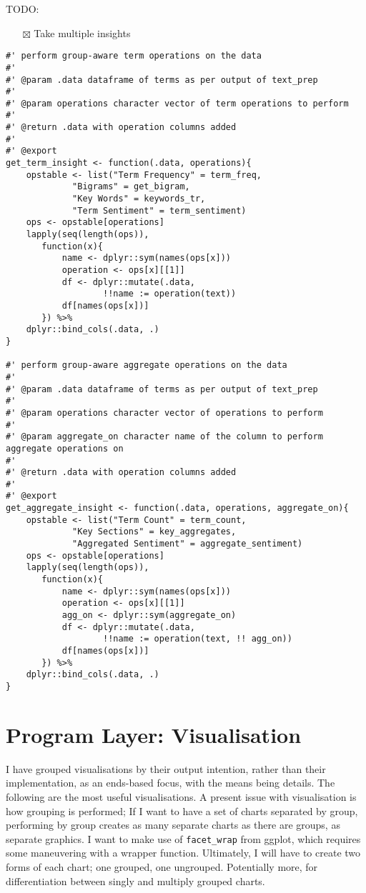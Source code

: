 \documentclass[a4paper, 11pt]{article}
\begin{document}
TODO:
\begin{itemize}
\item[{$\boxtimes$}] Take multiple insights
\end{itemize}
\begin{verbatim}
#' perform group-aware term operations on the data
#'
#' @param .data dataframe of terms as per output of text_prep
#'
#' @param operations character vector of term operations to perform
#'
#' @return .data with operation columns added
#'
#' @export
get_term_insight <- function(.data, operations){
    opstable <- list("Term Frequency" = term_freq,
		     "Bigrams" = get_bigram,
		     "Key Words" = keywords_tr,
		     "Term Sentiment" = term_sentiment)
    ops <- opstable[operations]
    lapply(seq(length(ops)),
	   function(x){
	       name <- dplyr::sym(names(ops[x]))
	       operation <- ops[x][[1]]
	       df <- dplyr::mutate(.data,
				   !!name := operation(text))
	       df[names(ops[x])]
	   }) %>%
	dplyr::bind_cols(.data, .)
}

#' perform group-aware aggregate operations on the data
#'
#' @param .data dataframe of terms as per output of text_prep
#'
#' @param operations character vector of operations to perform
#'
#' @param aggregate_on character name of the column to perform aggregate operations on
#'
#' @return .data with operation columns added
#'
#' @export
get_aggregate_insight <- function(.data, operations, aggregate_on){
    opstable <- list("Term Count" = term_count,
		     "Key Sections" = key_aggregates,
		     "Aggregated Sentiment" = aggregate_sentiment)
    ops <- opstable[operations]
    lapply(seq(length(ops)),
	   function(x){
	       name <- dplyr::sym(names(ops[x]))
	       operation <- ops[x][[1]]
	       agg_on <- dplyr::sym(aggregate_on)
	       df <- dplyr::mutate(.data,
				   !!name := operation(text, !! agg_on))
	       df[names(ops[x])]
	   }) %>%
	dplyr::bind_cols(.data, .)
}
\end{verbatim}
\section{Program Layer: Visualisation}
\label{sec:org8cc97a5}
I have grouped visualisations by their output intention, rather than
their implementation, as an ends-based focus, with the means being
details. The following are the most useful visualisations. A present
issue with visualisation is how grouping is performed; If I want to
have a set of charts separated by group, performing by group creates
as many separate charts as there are groups, as separate graphics. I
want to make use of \texttt{facet\_wrap} from ggplot, which requires some
maneuvering with a wrapper function. Ultimately, I will have to create
two forms of each chart; one grouped, one ungrouped. Potentially more,
for differentiation between singly and multiply grouped charts.
\end{document}
